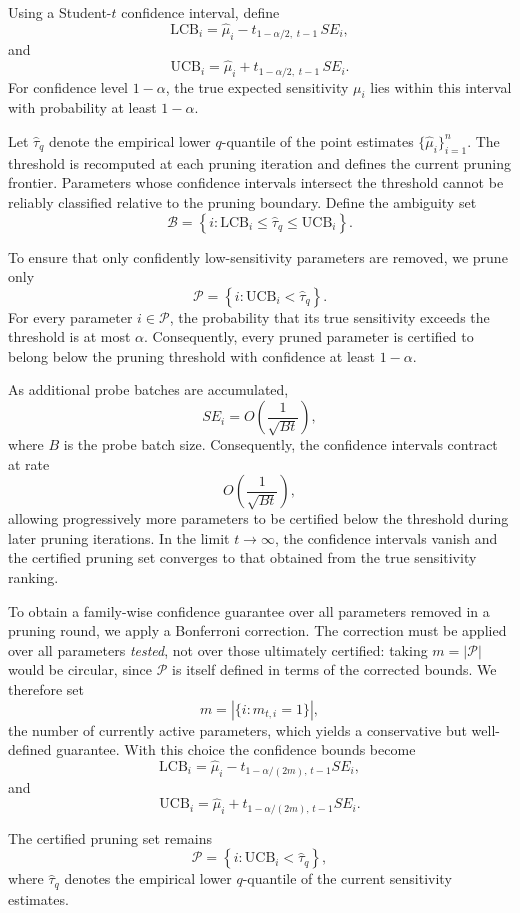 \documentclass{article}
\theoremstyle{definition}
\theoremstyle{remark}
\begin{document}
Using a Student-$t$ confidence interval, define
\[
\mathrm{LCB}_i
=
\hat{\mu}_i
-
t_{1-\alpha/2,\;t-1}\,
SE_i,
\]
and
\[
\mathrm{UCB}_i
=
\hat{\mu}_i
+
t_{1-\alpha/2,\;t-1}\,
SE_i.
\]
For confidence level $1-\alpha$, the true expected sensitivity $\mu_i$ lies within this interval with probability at least $1-\alpha$.

Let $\hat{\tau}_q$ denote the empirical lower $q$-quantile of the point estimates $\{\hat{\mu}_i\}_{i=1}^{n}$. The threshold is recomputed at each pruning iteration and defines the current pruning frontier. Parameters whose confidence intervals intersect the threshold cannot be reliably classified relative to the pruning boundary. Define the ambiguity set
\[
\mathcal B
=
\left\{
i :
\mathrm{LCB}_i
\le
\hat{\tau}_q
\le
\mathrm{UCB}_i
\right\}.
\]

To ensure that only confidently low-sensitivity parameters are removed, we prune only
\[
\mathcal P
=
\left\{
i :
\mathrm{UCB}_i < \hat{\tau}_q
\right\}.
\]
For every parameter $i\in\mathcal P$, the probability that its true sensitivity exceeds the threshold is at most $\alpha$. Consequently, every pruned parameter is certified to belong below the pruning threshold with confidence at least $1-\alpha$.

As additional probe batches are accumulated,
\[
SE_i
=
O\!\left(\frac{1}{\sqrt{Bt}}\right),
\]
where $B$ is the probe batch size. Consequently, the confidence intervals contract at rate
\[
O\!\left(\frac{1}{\sqrt{Bt}}\right),
\]
allowing progressively more parameters to be certified below the threshold during later pruning iterations. In the limit $t\rightarrow\infty$, the confidence intervals vanish and the certified pruning set converges to that obtained from the true sensitivity ranking.

To obtain a family-wise confidence guarantee over all parameters removed in a
pruning round, we apply a Bonferroni correction. The correction must be applied
over all parameters \emph{tested}, not over those ultimately certified: taking
$m=|\mathcal P|$ would be circular, since $\mathcal P$ is itself defined in
terms of the corrected bounds. We therefore set
\[
m = |\{i : m_{t,i}=1\}|,
\]
the number of currently active parameters, which yields a conservative but
well-defined guarantee. With this choice the confidence bounds become
\[
\mathrm{LCB}_i
=
\hat{\mu}_i
-
t_{1-\alpha/(2m),\,t-1}
SE_i,
\]
and
\[
\mathrm{UCB}_i
=
\hat{\mu}_i
+
t_{1-\alpha/(2m),\,t-1}
SE_i.
\]

The certified pruning set remains
\[
\mathcal P
=
\left\{
i :
\mathrm{UCB}_i < \hat{\tau}_q
\right\},
\]
where $\hat{\tau}_q$ denotes the empirical lower $q$-quantile of the current sensitivity estimates.
\end{document}
